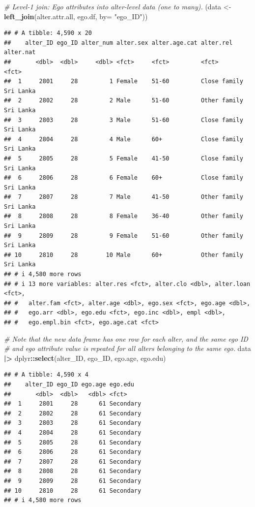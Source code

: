 \documentclass[
]{book}
\newenvironment{Shaded}{\begin{snugshade}}{\end{snugshade}}
\newcommand{\AttributeTok}[1]{\textcolor[rgb]{0.13,0.29,0.53}{#1}}
\newcommand{\CommentTok}[1]{\textcolor[rgb]{0.56,0.35,0.01}{\textit{#1}}}
\newcommand{\FunctionTok}[1]{\textcolor[rgb]{0.13,0.29,0.53}{\textbf{#1}}}
\newcommand{\NormalTok}[1]{#1}
\newcommand{\OtherTok}[1]{\textcolor[rgb]{0.56,0.35,0.01}{#1}}
\newcommand{\SpecialCharTok}[1]{\textcolor[rgb]{0.81,0.36,0.00}{\textbf{#1}}}
\newcommand{\StringTok}[1]{\textcolor[rgb]{0.31,0.60,0.02}{#1}}
\begin{document}
\begin{Shaded}
\begin{Highlighting}[]
\CommentTok{\# Level{-}1 join: Ego attributes into alter{-}level data (one to many).}
\NormalTok{(data }\OtherTok{\textless{}{-}} \FunctionTok{left\_join}\NormalTok{(alter.attr.all, ego.df, }\AttributeTok{by=} \StringTok{"ego\_ID"}\NormalTok{))}
\end{Highlighting}
\end{Shaded}

\begin{verbatim}
## # A tibble: 4,590 x 20
##    alter_ID ego_ID alter_num alter.sex alter.age.cat alter.rel    alter.nat
##       <dbl>  <dbl>     <dbl> <fct>     <fct>         <fct>        <fct>    
##  1     2801     28         1 Female    51-60         Close family Sri Lanka
##  2     2802     28         2 Male      51-60         Other family Sri Lanka
##  3     2803     28         3 Male      51-60         Close family Sri Lanka
##  4     2804     28         4 Male      60+           Close family Sri Lanka
##  5     2805     28         5 Female    41-50         Close family Sri Lanka
##  6     2806     28         6 Female    60+           Close family Sri Lanka
##  7     2807     28         7 Male      41-50         Other family Sri Lanka
##  8     2808     28         8 Female    36-40         Other family Sri Lanka
##  9     2809     28         9 Female    51-60         Other family Sri Lanka
## 10     2810     28        10 Male      60+           Other family Sri Lanka
## # i 4,580 more rows
## # i 13 more variables: alter.res <fct>, alter.clo <dbl>, alter.loan <fct>,
## #   alter.fam <fct>, alter.age <dbl>, ego.sex <fct>, ego.age <dbl>,
## #   ego.arr <dbl>, ego.edu <fct>, ego.inc <dbl>, empl <dbl>,
## #   ego.empl.bin <fct>, ego.age.cat <fct>
\end{verbatim}

\begin{Shaded}
\begin{Highlighting}[]
\CommentTok{\# Note that the new data frame has one row for each alter, and the same ego ID}
\CommentTok{\# and ego attribute value is repeated for all alters belonging to the same ego.}
\NormalTok{data }\SpecialCharTok{|\textgreater{}} 
\NormalTok{  dplyr}\SpecialCharTok{::}\FunctionTok{select}\NormalTok{(alter\_ID, ego\_ID, ego.age, ego.edu)}
\end{Highlighting}
\end{Shaded}

\begin{verbatim}
## # A tibble: 4,590 x 4
##    alter_ID ego_ID ego.age ego.edu  
##       <dbl>  <dbl>   <dbl> <fct>    
##  1     2801     28      61 Secondary
##  2     2802     28      61 Secondary
##  3     2803     28      61 Secondary
##  4     2804     28      61 Secondary
##  5     2805     28      61 Secondary
##  6     2806     28      61 Secondary
##  7     2807     28      61 Secondary
##  8     2808     28      61 Secondary
##  9     2809     28      61 Secondary
## 10     2810     28      61 Secondary
## # i 4,580 more rows
\end{verbatim}
\end{document}
